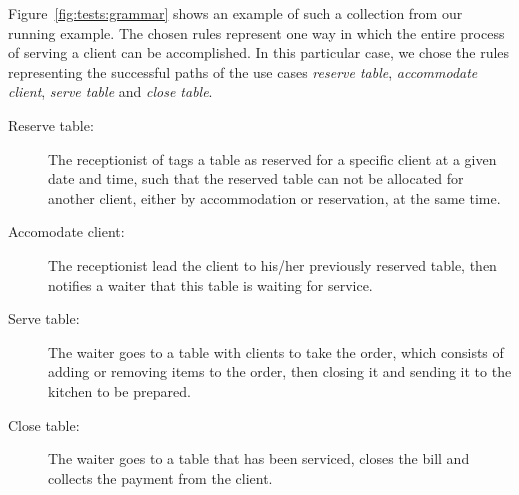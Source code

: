 \begin{example} Figure~\ref{fig:tests:grammar} shows an example of such a collection from our running example. The chosen rules represent one way in which the entire process of serving a client can be accomplished. In this particular case, we chose the rules representing the successful paths of the use cases \emph{reserve table}, \emph{accommodate client}, \emph{serve table} and \emph{close table}.

\begin{description}
  \item[Reserve table:] The receptionist of tags a table as reserved for a specific client at a given date and time, such that the reserved table can not be allocated for another client, either by accommodation or reservation, at the same time.
  \item[Accomodate client:] The receptionist lead the client to his/her previously reserved table, then notifies a waiter that this table is waiting for service.
  \item[Serve table:] The waiter goes to a table with clients to take the order, which consists of adding or removing items to the order, then closing it and sending it to the kitchen to be prepared.
  \item[Close table:] The waiter goes to a table that has been serviced, closes the bill and collects the payment from the client.
\end{description}


\end{example}
